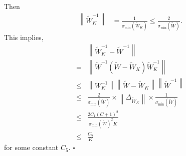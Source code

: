 \documentclass[11pt,a4paper]{article}
\newcommand{\qed}{\square}
\newcommand{\wt}[1]{\widetilde{#1}}
\newcommand{\wbk}{\wt{W}_{K}}
\newcommand{\wb}{\wt{W}}
\newcommand{\vnorm}[1]{\left\| #1 \right\|}
\begin{document}
Then
\begin{equation*}
\begin{aligned}
\vnorm{\wbk^{-1}} &= \frac{1}{ \sigma_{\min}\left(\wbk\right)} \leq \frac{2}{\sigma_{\min}\left(\wb\right)}. 
\end{aligned}
\end{equation*}
This implies, 
\begin{equation*}
\begin{aligned}
& \vnorm{\wbk^{-1} - \wb^{-1}} \\
= &  \vnorm{\wb^{-1} (\wb - \wbk) \wbk^{-1} } \\
\leq &  \vnorm{W_K^{-1}} \vnorm{\wb - \wbk} \vnorm{\wb^{-1}} \\
\leq &  \frac{2}{\sigma_{\min}\left(\wb\right)} \times \vnorm{\Delta_{\wbk}} \times \frac{1}{\sigma_{\min}(\wb)} \\
\leq &  \frac{2C_1(C+1)^2}{\sigma_{\min}(\wb)^2 K}\\
\leq &  \frac{C_5}{K}
\end{aligned}
\end{equation*}
for some constant $C_5$. $\qed$
\end{document}
